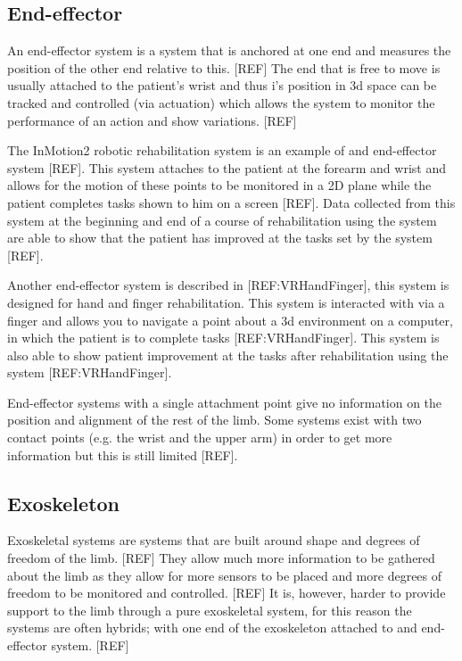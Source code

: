 \documentclass[journal]{IEEEtran}
\begin{document}
\subsection{End-effector}
An end-effector system is a system that is anchored at one end and measures the position of 
the other end relative to this. [REF] The end that is free to move is usually attached to the 
patient's wrist and thus i's position in 3d space can be tracked and controlled (via actuation) 
which allows the system to monitor the performance of an action and show variations. [REF]

The InMotion2 robotic rehabilitation system is an example of and end-effector system [REF]. 
This system attaches to the patient at the forearm and wrist and allows for the motion of these 
points to be monitored in a 2D plane while the patient completes tasks shown to him on 
a screen [REF]. Data collected from this system at the beginning and end of a course of 
rehabilitation using the system are able to show that the patient has improved at the tasks 
set by the system [REF].

Another end-effector system is described in [REF:VRHandFinger], this system is designed for 
hand and finger rehabilitation. This system is interacted with via a finger and allows you to navigate 
a point about a 3d environment on a computer, in which the patient is to complete tasks [REF:VRHandFinger].
This system is also able to show patient improvement at the tasks after rehabilitation using the 
system [REF:VRHandFinger].

End-effector systems with a single attachment point give no information on the position and 
alignment of the rest of the limb. Some systems exist with two contact points (e.g. the wrist 
and the upper arm) in order to get more information but this is still limited [REF].

\subsection{Exoskeleton}
Exoskeletal systems are systems that are built around shape and degrees of freedom of the limb. [REF] 
They allow much more information to be gathered about the limb as they allow for more sensors to be 
placed and more degrees of freedom to be monitored and controlled. [REF] It is, however, harder to 
provide support to the limb through a pure exoskeletal system, for this reason the systems are often 
hybrids; with one end of the exoskeleton attached to and end-effector system. [REF]
\end{document}
